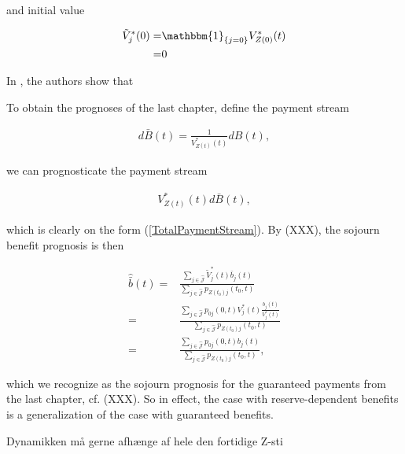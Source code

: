 \documentclass{book}
\newcommand{\1}[1]{\mathbbm{1}_{\left\lbrace #1 \right\rbrace}}
\theoremstyle{break}
\theoremstyle{remark}
\newenvironment{remark}
  {\pushQED{\qed}\renewcommand{\qedsymbol}{\scalebox{1.4}{$\circ$}}\remarkx}
  {\popQED\endremarkx}
\numberwithin{equation}{section}
\begin{document}
\begin{remark}
	and initial value
	
	\begin{align*}
	\tilde{V}_j^*(0) =& \1{j=0} V_{Z(0)}^*(t) \\
	=& 0
	\end{align*}

	In \cite{Lollike}, the authors show that 

	To obtain the prognoses of the last chapter, define the payment stream
	
	\begin{align*}
		d\bar{B}(t) = \frac{1}{V_{Z(t)}^*(t)}dB(t),
	\end{align*}

	we can prognosticate the payment stream
	
	\begin{align*}
	V_{Z(t)}^*(t) d\bar{B}(t),
	\end{align*}
	
	which is clearly on the form (\ref{TotalPaymentStream}). By (XXX), the sojourn benefit prognosis is then
	
	\begin{align*}
	\hat{\bar{b}}(t) =& \frac{\sum_{j \in \hat{\mathcal{J}}} \tilde{V}_j^*(t) \bar{b}_j(t)}{\sum_{j \in \hat{\mathcal{J}}} p_{Z(t_0)j}(t_0,t)} \\
	=& \frac{\sum_{j \in \hat{\mathcal{J}}} p_{0j}(0,t) V_j^*(t) \frac{b_j(t)}{V_j^*(t)}}{\sum_{j \in \hat{\mathcal{J}}} p_{Z(t_0)j}(t_0,t)} \\
	=& \frac{\sum_{j \in \hat{\mathcal{J}}} p_{0j}(0,t) b_j(t)}{\sum_{j \in \hat{\mathcal{J}}} p_{Z(t_0)j}(t_0,t)},
	\end{align*}

	which we recognize as the sojourn prognosis for the guaranteed payments from the last chapter, cf. (XXX). So in effect, the case with reserve-dependent benefits is a generalization of the case with guaranteed benefits.
\end{remark}

\begin{remark}
	Dynamikken må gerne afhænge af hele den fortidige Z-sti
\end{remark}
\end{document}
